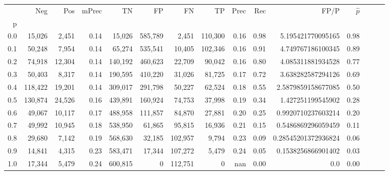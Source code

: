 \begin{tabular}{rrrrrrrrrrrrrrr}
\toprule
{} &      Neg &     Pos & mPrec &       TN &       FP &       FN &       TP &  Prec &   Rec &                 FP/P & $\hat{p}$ \\
p   &          &         &       &          &          &          &          &       &       &                      &           \\
\midrule
0.0 &   15,026 &   2,451 &  0.14 &   15,026 &  585,789 &    2,451 &  110,300 &  0.16 &  0.98 &    5.195421770095165 &      0.98 \\
0.1 &   50,248 &   7,954 &  0.14 &   65,274 &  535,541 &   10,405 &  102,346 &  0.16 &  0.91 &    4.749767186100345 &      0.89 \\
0.2 &   74,918 &  12,304 &  0.14 &  140,192 &  460,623 &   22,709 &   90,042 &  0.16 &  0.80 &    4.085311881934528 &      0.77 \\
0.3 &   50,403 &   8,317 &  0.14 &  190,595 &  410,220 &   31,026 &   81,725 &  0.17 &  0.72 &    3.638282587294126 &      0.69 \\
0.4 &  118,422 &  19,201 &  0.14 &  309,017 &  291,798 &   50,227 &   62,524 &  0.18 &  0.55 &   2.5879859158677085 &      0.50 \\
0.5 &  130,874 &  24,526 &  0.16 &  439,891 &  160,924 &   74,753 &   37,998 &  0.19 &  0.34 &    1.427251199545902 &      0.28 \\
0.6 &   49,067 &  10,117 &  0.17 &  488,958 &  111,857 &   84,870 &   27,881 &  0.20 &  0.25 &   0.9920710237603214 &      0.20 \\
0.7 &   49,992 &  10,945 &  0.18 &  538,950 &   61,865 &   95,815 &   16,936 &  0.21 &  0.15 &   0.5486869296059459 &      0.11 \\
0.8 &   29,680 &   7,142 &  0.19 &  568,630 &   32,185 &  102,957 &    9,794 &  0.23 &  0.09 &  0.28545201372936824 &      0.06 \\
0.9 &   14,841 &   4,315 &  0.23 &  583,471 &   17,344 &  107,272 &    5,479 &  0.24 &  0.05 &   0.1538256866901402 &      0.03 \\
1.0 &   17,344 &   5,479 &  0.24 &  600,815 &        0 &  112,751 &        0 &   nan &  0.00 &                  0.0 &      0.00 \\
\bottomrule
\end{tabular}
